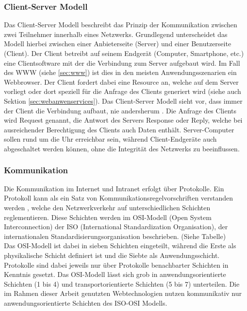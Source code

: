  \subsubsection{Client-Server Modell}\label{sec:clientservermodell}
 Das Client-Server Modell beschreibt das Prinzip der Kommunikation zwischen zwei Teilnehmer innerhalb eines Netzwerks. Grundlegend unterscheidet das Modell hierbei zwischen einer Anbieterseite (Server) und einer Benutzerseite (Client). Der Client betreibt auf seinem Endgerät (Computer, Smartphone, etc.) eine Clientsoftware mit der die Verbindung zum Server aufgebaut wird. Im Fall des WWW (siehe \ref{sec:www}) ist dies in den meisten Anwendungsszenarien ein Webbrowser. Der Client fordert dabei eine Resource an, welche auf dem Server vorliegt oder dort speziell für die Anfrage des Clients generiert wird (siehe auch Sektion \ref{sec:webanwenservices}). Das Client-Server Modell sieht vor, dass immer der Client die Verbindung aufbaut, nie andersherum \cite{ElektronikKompendium.de:online}. Die Anfrage des Clients wird Request genannt, die Antwort des Servers Response oder Reply, welche bei ausreichender Berechtigung des Clients auch Daten enthält. 
 Server-Computer sollen rund um die Uhr erreichbar sein, während Client-Endgeräte auch abgeschaltet werden können, ohne die Integrität des Netzwerks zu beeinflussen. 
 
\subsubsection{Kommunikation}\label{sec:kommunikation}
Die Kommunikation im Internet und Intranet erfolgt über Protokolle. 
Ein Protokoll kann als ein Satz von Kommunikationsregelvorschriften verstanden werden \cite{Safran2011}, welche den Netzwerkverkehr auf unterschiedlichen Schichten reglementieren. 
Diese Schichten werden im OSI-Modell (Open System Interconnection) der ISO (International Standardization Organisation), der internationalen Standardisierungsorganisation beschrieben. (Siehe Tabelle) %
\\ 
Das OSI-Modell ist dabei in sieben Schichten eingeteilt, während die Erste als physikalische Schicht definiert ist und die Siebte als Anwendungsschicht. Protokolle sind dabei jeweils nur über Protokolle benachbarter Schichten in Kenntnis gesetzt. Das OSI-Modell lässt sich grob in anwendungsorientierte Schichten (1 bis 4) und transportorientierte Schichten (5 bis 7) unterteilen. Die im Rahmen dieser Arbeit genutzten Webtechnologien nutzen kommunikativ nur anwendungsorientierte Schichten des ISO-OSI Modells.



